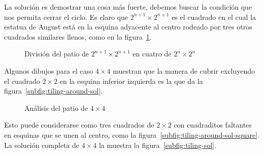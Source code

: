   La solución es demostrar una cosa más fuerte,
  debemos buscar la condición que nos permita cerrar el ciclo.
  Es claro que \mbox{\(2^{n + 1} \times 2^{n + 1}\)} es el cuadrado
  en el cual la estatua de \foreignlanguage{english}{August}
  está en la esquina adyacente al centro
  rodeado por tres otros cuadrados similares llenos,
  como en la figura~\ref{fig:tiling-around}.
  \begin{figure}[htbp]
    \centering
    \caption{División del patio de $2^{n + 1} \times 2^{n + 1}$
	     en cuatro de $2^n \times 2^n$}
    \label{fig:tiling-around}
  \end{figure}
  Algunos dibujos para el caso \mbox{\(4 \times 4\)}
  muestran que la manera de cubrir
  excluyendo el cuadrado \mbox{\(2 \times 2\)}
  en la esquina inferior izquierda
  es la que da la figura~\ref{subfig:tiling-around-sol}.
  \begin{figure}[htbp]
    \centering
    \qquad
    \qquad
    \caption{Análisis del patio de $4 \times 4$}
    \label{fig:tiling-around-sol}
  \end{figure}
  Esto puede considerarse
  como tres cuadrados de \mbox{\(2 \times 2\)}
  con cuadraditos faltantes en esquinas que se unen al centro,
  como la figura~\ref{subfig:tiling-around-sol-square}.
  La solución completa de \mbox{\(4 \times 4\)}
  la muestra la figura~\ref{subfig:tiling-sol}.

